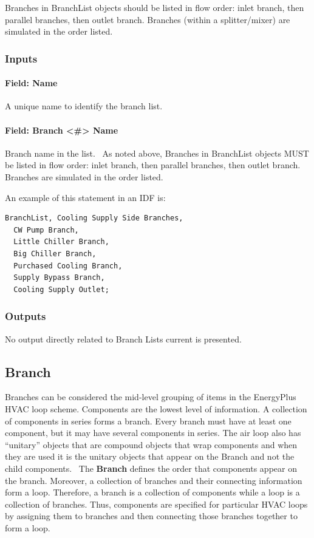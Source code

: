 Branches in BranchList objects should be listed in flow order: inlet branch, then parallel branches, then outlet branch. Branches (within a splitter/mixer) are simulated in the order listed.

\subsubsection{Inputs}\label{inputs-1-025}

\paragraph{Field: Name}\label{field-name-1-024}

A unique name to identify the branch list.

\paragraph{Field: Branch \textless{}\#\textgreater{} Name}\label{field-branch-name}

Branch name in the list.~ As noted above, Branches in BranchList objects MUST be listed in flow order: inlet branch, then parallel branches, then outlet branch. Branches are simulated in the order listed.

An example of this statement in an IDF is:

\begin{lstlisting}
BranchList, Cooling Supply Side Branches,
  CW Pump Branch,
  Little Chiller Branch,
  Big Chiller Branch,
  Purchased Cooling Branch,
  Supply Bypass Branch,
  Cooling Supply Outlet;
\end{lstlisting}

\subsubsection{Outputs}\label{outputs-1-016}

No output directly related to Branch Lists current is presented.

\subsection{Branch}\label{branch}

Branches can be considered the mid-level grouping of items in the EnergyPlus HVAC loop scheme. Components are the lowest level of information. A collection of components in series forms a branch. Every branch must have at least one component, but it may have several components in series. The air loop also has ``unitary'' objects that are compound objects that wrap components and when they are used it is the unitary objects that appear on the Branch and not the child components.~ The \textbf{Branch} defines the order that components appear on the branch. Moreover, a collection of branches and their connecting information form a loop. Therefore, a branch is a collection of components while a loop is a collection of branches. Thus, components are specified for particular HVAC loops by assigning them to branches and then connecting those branches together to form a loop.

